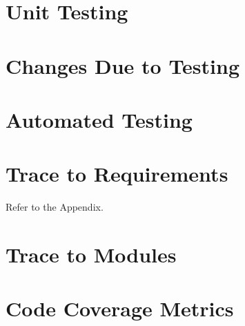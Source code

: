 \documentclass[12pt, titlepage]{article}
\begin{document}
\section{Unit Testing}

\section{Changes Due to Testing}

\section{Automated Testing}
		
\section{Trace to Requirements}
Refer to the Appendix.
		
\section{Trace to Modules}		

\section{Code Coverage Metrics}

\newpage
\end{document}
